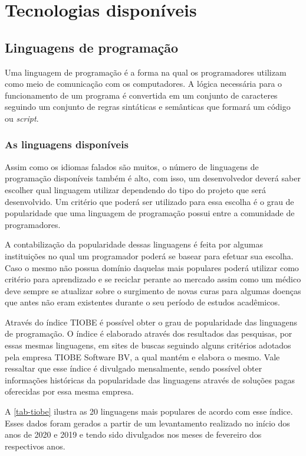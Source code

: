 \chapter{Tecnologias disponíveis} \label{Tecnologias disponíveis}

\section{Linguagens de programação}

Uma linguagem de programação é a forma na qual os programadores utilizam como meio de comunicação com os computadores. A lógica necessária para o funcionamento de um programa é convertida em um conjunto de caracteres seguindo um conjunto de regras sintáticas e semânticas que formará um código ou \textit{script}.

\subsection{As linguagens disponíveis}

Assim como os idiomas falados são muitos, o número de linguagens de programação disponíveis também é alto, com isso, um desenvolvedor deverá saber escolher qual linguagem utilizar dependendo do tipo do projeto que será desenvolvido. Um critério que poderá ser utilizado para essa escolha é o grau de popularidade que uma linguagem de programação possui entre a comunidade de programadores.

A contabilização da popularidade dessas linguagens é feita por algumas instituições no qual um programador poderá se basear para efetuar sua escolha. Caso o mesmo não possua domínio daquelas mais populares poderá utilizar como critério para aprendizado e se reciclar perante ao mercado assim como um médico deve sempre se atualizar sobre o surgimento de novas curas para algumas doenças que antes não eram existentes durante o seu período de estudos acadêmicos.

Através do índice TIOBE é possível obter o grau de popularidade das linguagens de programação. O índice é elaborado através dos resultados das pesquisas, por essas mesmas linguagens, em sites de buscas seguindo alguns critérios adotados pela empresa TIOBE Software BV, a qual mantém e elabora o mesmo. Vale ressaltar que esse índice é divulgado mensalmente, sendo possível obter informações históricas da popularidade das linguagens através de soluções pagas oferecidas por essa mesma empresa.

A \autoref{tab-tiobe} ilustra as 20 linguagens mais populares de acordo com esse índice. Esses dados foram gerados a partir de um levantamento realizado no início dos anos de 2020 e 2019 e tendo sido divulgados nos meses de fevereiro dos respectivos anos.

